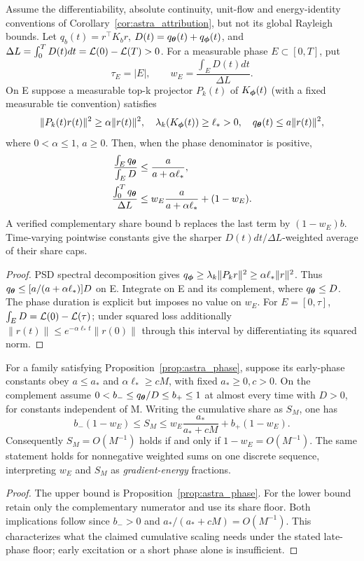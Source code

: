 \begin{proposition}
\label{prop:astra_phase}
Assume the differentiability, absolute continuity, unit-flow and
energy-identity conventions of Corollary~\ref{cor:astra_attribution},
but not its global Rayleigh bounds. Let
$q_b(t)=r^\top K_br$, $D(t)=q_{\boldsymbol{\theta}}(t)+q_{\boldsymbol{\phi}}(t)$, and
$\Delta L=\int_0^TD(t)dt=\mathcal{L}(0)-\mathcal{L}(T)>0$.
For a measurable phase $E\subset[0,T]$, put
\[
 \tau_E=|E|,\qquad w_E=\frac{\int_E D(t)dt}{\Delta L}.
\]
On E suppose a measurable top-k projector $P_k(t)$ of $K_{\boldsymbol{\phi}}(t)$
(with a fixed measurable tie convention) satisfies
\[
 \|P_k(t)r(t)\|^2\ge\alpha\|r(t)\|^2,\quad
 \lambda_k(K_{\boldsymbol{\phi}}(t))\ge\ell_*>0,\quad
 q_{\boldsymbol{\theta}}(t)\le a\|r(t)\|^2,
\]
where $0<\alpha\le1$, $a\ge0$. Then, when the phase denominator is positive,
\begin{align}
 \frac{\int_E q_{\boldsymbol{\theta}}}{\int_E D}&\le\frac{a}{a+\alpha\ell_*},
 \label{eq:astra_phase}\\
 \frac{\int_0^Tq_{\boldsymbol{\theta}}}{\Delta L}
 &\le w_E\frac{a}{a+\alpha\ell_*}+(1-w_E).
 \label{eq:astra_phase_total}
\end{align}
A verified complementary share bound b replaces the last term by
$(1-w_E)b$. Time-varying pointwise constants give the sharper
$D(t)dt/\Delta L$-weighted average of their share caps.
\end{proposition}
\begin{proof}
PSD spectral decomposition gives
$q_{\boldsymbol{\phi}}\ge\lambda_k\|P_kr\|^2\ge\alpha\ell_*\|r\|^2$.
Thus $q_{\boldsymbol{\theta}}\le[a/(a+\alpha\ell_*)]D$ on E.
Integrate on E and its complement, where $q_{\boldsymbol{\theta}}\le D$.
The phase duration is explicit but imposes no value on $w_E$.
For $E=[0,\tau]$, $\int_E D=\mathcal{L}(0)-\mathcal{L}(\tau)$; under squared
loss additionally $\|r(t)\|\le e^{-\alpha\ell_*t}\|r(0)\|$
through this interval by differentiating its squared norm.
\end{proof}
\begin{corollary}
\label{cor:astra_phase_width}
For a family satisfying Proposition~\ref{prop:astra_phase}, suppose
its early-phase constants obey $a\le a_*$ and
$\alpha\ell_*\ge cM$, with fixed $a_*\ge0,c>0$. On the complement
assume $0<b_-\le q_{\boldsymbol{\theta}}/D\le b_+\le1$ at almost every time with
$D>0$, for constants independent of M. Writing the cumulative share
as $S_M$, one has
\[
 b_-(1-w_E)\le S_M
 \le w_E\frac{a_*}{a_*+cM}+b_+(1-w_E).
\]
Consequently $S_M=O(M^{-1})$ holds if and only if
$1-w_E=O(M^{-1})$. The same statement holds for nonnegative weighted
sums on one discrete sequence, interpreting $w_E$ and $S_M$ as
\emph{gradient-energy} fractions.
\end{corollary}
\begin{proof}
The upper bound is Proposition~\ref{prop:astra_phase}. For the lower
bound retain only the complementary numerator and use its share floor.
Both implications follow since $b_->0$ and $a_*/(a_*+cM)=O(M^{-1})$.
This characterizes what the claimed cumulative scaling needs under the
stated late-phase floor; early excitation or a short phase alone is insufficient.
\end{proof}

